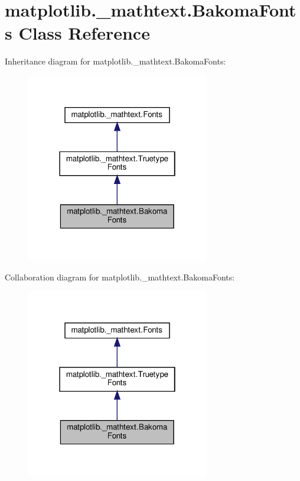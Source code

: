 \hypertarget{classmatplotlib_1_1__mathtext_1_1BakomaFonts}{}\section{matplotlib.\+\_\+mathtext.\+Bakoma\+Fonts Class Reference}
\label{classmatplotlib_1_1__mathtext_1_1BakomaFonts}


Inheritance diagram for matplotlib.\+\_\+mathtext.\+Bakoma\+Fonts\+:
\nopagebreak
\begin{figure}[H]
\begin{center}
\leavevmode
\includegraphics[width=226pt]{classmatplotlib_1_1__mathtext_1_1BakomaFonts__inherit__graph}
\end{center}
\end{figure}


Collaboration diagram for matplotlib.\+\_\+mathtext.\+Bakoma\+Fonts\+:
\nopagebreak
\begin{figure}[H]
\begin{center}
\leavevmode
\includegraphics[width=226pt]{classmatplotlib_1_1__mathtext_1_1BakomaFonts__coll__graph}
\end{center}
\end{figure}
